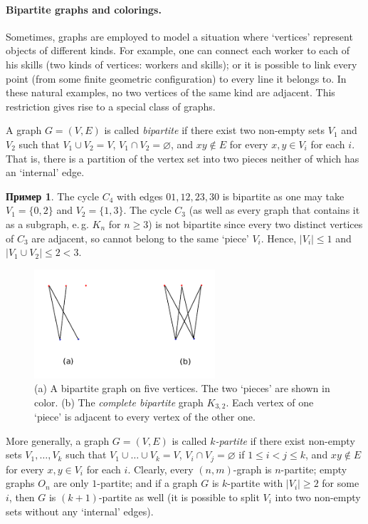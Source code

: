 \documentclass[12pt,notitlepage]{article}
\theoremstyle{plain}
\theoremstyle{definition}
\newtheorem{exm}[thm]{Пример}
\theoremstyle{plain}
\newcommand{\void}{\varnothing}
\newcommand{\1}{\mathbf{1}}
\newcommand{\0}{\mathbf{0}}
\begin{document}
\paragraph{Bipartite graphs and colorings.} Sometimes, graphs are employed to model a situation where `vertices' represent objects of different kinds. For example, one can connect each worker to each of his skills (two kinds of vertices: workers and skills); or it is possible to link every point (from some finite geometric configuration) to every line it belongs to. In these natural examples, no two vertices of the same kind are adjacent. This restriction gives rise to a special class of graphs.

A graph $G = (V, E)$ is called \emph{bipartite} if there exist two non-empty sets $V_1$ and $V_2$ such that $V_1 \cup V_2 = V$, $V_1 \cap V_2 = \void$, and $x y \notin E$ for every $x, y \in V_i$ for each $i$. That is, there is a partition of the vertex set into two pieces neither of which has an `internal' edge.

\begin{exm}
	The cycle $C_4$ with edges $01, 12, 23, 30$ is bipartite as one may take $V_1 = \{0, 2\}$ and $V_2 = \{1, 3\}$. The cycle $C_3$ (as well as every graph that contains it as a subgraph, e.\,g. $K_n$ for $n \geq 3$) is not bipartite since every two distinct vertices of $C_3$ are adjacent, so cannot belong to the same `piece' $V_i$. Hence, $|V_i| \leq 1$ and $|V_1 \cup V_2| \leq 2 < 3$.
\end{exm}

\begin{figure}[h]
	\centering
	\includegraphics*[width=0.6\textwidth]{graph_bipartite.pdf}
	\caption{(a) A bipartite graph on five vertices. The two `pieces' are shown in color. (b) The \emph{complete bipartite} graph $K_{3, 2}$. Each vertex of one `piece' is adjacent to every vertex of the other one.}
\end{figure}


More generally, a graph $G = (V, E)$ is called \emph{$k$-partite} if there exist non-empty sets $V_1,\ldots, V_k$ such that $V_1 \cup \ldots \cup  V_k = V$, $V_i \cap V_j = \void$ if $1 \leq i < j \leq k$, and $x y \notin E$ for every $x, y \in V_i$ for each $i$. Clearly, every $(n,m)$-graph is $n$-partite; empty graphs $O_n$ are only $1$-partite; and if a graph $G$ is $k$-partite with $|V_i| \geq 2$ for some $i$, then $G$ is $(k+1)$-partite as well (it is possible to split $V_i$ into two non-empty sets without any `internal' edges).
\end{document}
